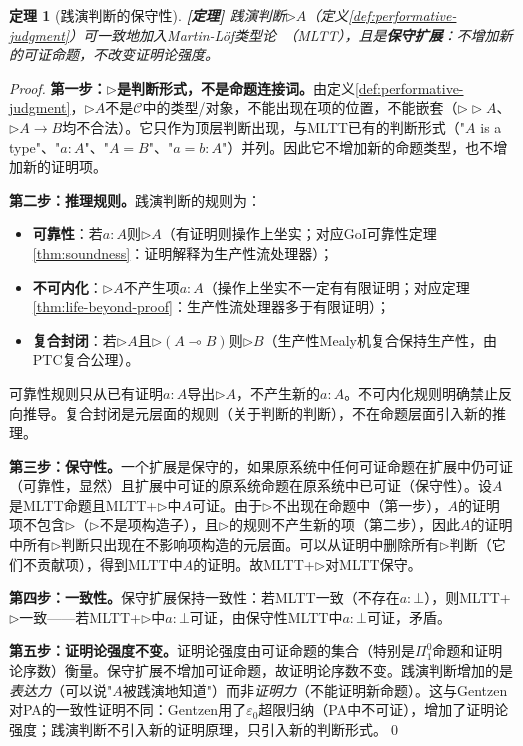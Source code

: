 \documentclass[11pt,a4paper]{article}
\newtheorem{theorem}{定理}
\newcommand{\lvl}[1]{\hfill\textbf{\footnotesize[#1]}}
\newcommand{\lvP}{\lvl{定理}}
\begin{document}
\begin{theorem}[践演判断的保守性]\label{thm:performative-conservative}\lvP
践演判断$\triangleright A$（定义\ref{def:performative-judgment}）可一致地加入Martin-L\"of类型论~\cite{martinlof84}（MLTT），且是\textbf{保守扩展}：不增加新的可证命题，不改变证明论强度。
\end{theorem}

\begin{proof}
\textbf{第一步：$\triangleright$是判断形式，不是命题连接词。}由定义\ref{def:performative-judgment}，$\triangleright A$不是$\mathcal{C}$中的类型/对象，不能出现在项的位置，不能嵌套（$\triangleright\triangleright A$、$\triangleright A\to B$均不合法）。它只作为顶层判断出现，与MLTT已有的判断形式（"$A$ is a type"、"$a:A$"、"$A=B$"、"$a=b:A$"）并列。因此它不增加新的命题类型，也不增加新的证明项。

\textbf{第二步：推理规则。}践演判断的规则为：
\begin{itemize}
  \item \textbf{可靠性}：若$a:A$则$\triangleright A$（有证明则操作上坐实；对应GoI可靠性定理\ref{thm:soundness}：证明解释为生产性流处理器）；
  \item \textbf{不可内化}：$\triangleright A$不产生项$a:A$（操作上坐实不一定有有限证明；对应定理\ref{thm:life-beyond-proof}：生产性流处理器多于有限证明）；
  \item \textbf{复合封闭}：若$\triangleright A$且$\triangleright(A\multimap B)$则$\triangleright B$（生产性Mealy机复合保持生产性，由PTC复合公理）。
\end{itemize}
可靠性规则只从已有证明$a:A$导出$\triangleright A$，不产生新的$a:A$。不可内化规则明确禁止反向推导。复合封闭是元层面的规则（关于判断的判断），不在命题层面引入新的推理。

\textbf{第三步：保守性。}一个扩展是保守的，如果原系统中任何可证命题在扩展中仍可证（可靠性，显然）且扩展中可证的原系统命题在原系统中已可证（保守性）。设$A$是MLTT命题且MLTT+$\triangleright$中$A$可证。由于$\triangleright$不出现在命题中（第一步），$A$的证明项不包含$\triangleright$（$\triangleright$不是项构造子），且$\triangleright$的规则不产生新的项（第二步），因此$A$的证明中所有$\triangleright$判断只出现在不影响项构造的元层面。可以从证明中删除所有$\triangleright$判断（它们不贡献项），得到MLTT中$A$的证明。故MLTT+$\triangleright$对MLTT保守。

\textbf{第四步：一致性。}保守扩展保持一致性：若MLTT一致（不存在$a:\bot$），则MLTT+$\triangleright$一致——若MLTT+$\triangleright$中$a:\bot$可证，由保守性MLTT中$a:\bot$可证，矛盾。

\textbf{第五步：证明论强度不变。}证明论强度由可证命题的集合（特别是$\Pi^0_1$命题和证明论序数）衡量。保守扩展不增加可证命题，故证明论序数不变。践演判断增加的是\emph{表达力}（可以说"$A$被践演地知道"）而非\emph{证明力}（不能证明新命题）。这与Gentzen对PA的一致性证明不同：Gentzen用了$\varepsilon_0$超限归纳（PA中不可证），增加了证明论强度；践演判断不引入新的证明原理，只引入新的判断形式。\qed
\end{proof}
\end{document}
